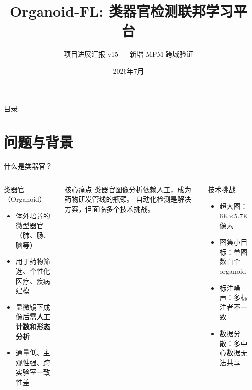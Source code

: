 \documentclass[aspectratio=169, 10pt]{beamer}
\title[Organoid-FL]{Organoid-FL: 类器官检测联邦学习平台}
\subtitle{项目进展汇报 v15 — 新增 MPM 跨域验证}
\date{2026年7月}
\begin{document}
\begin{frame}[plain]
  \titlepage
\end{frame}

\begin{frame}{目录}
  \tableofcontents
\end{frame}

\section{问题与背景}

\begin{frame}{什么是类器官？}
  \begin{columns}[T]
    \begin{block}{类器官（Organoid）}
      \begin{itemize}
        \item 体外培养的微型器官（肺、肠、脑等）
        \item 用于药物筛选、个性化医疗、疾病建模
        \item 显微镜下成像后需\textbf{人工计数和形态分析}
        \item 通量低、主观性强、跨实验室一致性差
      \end{itemize}
    \end{block}
    \vspace{0em}
    \begin{alertblock}{核心痛点}
      类器官图像分析依赖人工，成为药物研发管线的瓶颈。
      自动化检测是解决方案，但面临多个技术挑战。
    \end{alertblock}
    \begin{block}{技术挑战}
      \begin{itemize}
        \item \alert{超大图}：6K$\times$5.7K 像素
        \item \alert{密集小目标}：单图数百个 organoid
        \item \alert{标注噪声}：多标注者不一致
        \item \alert{数据分散}：多中心数据无法共享
      \end{itemize}
    \end{block}
  \end{columns}
\end{frame}
\end{document}
